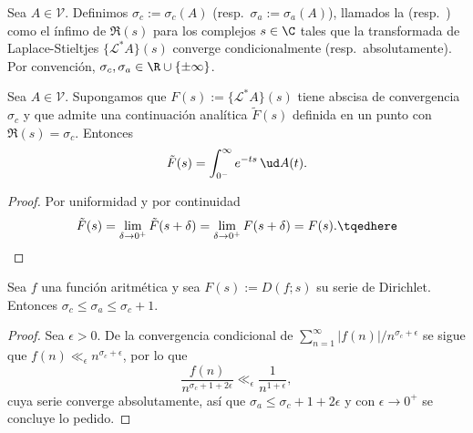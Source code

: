 \documentclass[teoria-numeros.tex]{subfiles}
\begin{document}
\begin{mydef}
	Sea $A \in \mathcal{V}$.
	Definimos $\sigma_c := \sigma_c(A)$ (resp.\ $\sigma_a := \sigma_a(A)$), llamados la 
	(resp.\ ) como el ínfimo de $\Re(s)$ para los complejos $s \in \C$ tales que
	la transformada de Laplace-Stieltjes $\{ \mathcal{L}^*A \}(s)$ converge condicionalmente (resp.\ absolutamente).
	Por convención, $\sigma_c, \sigma_a \in \R \cup \{ \pm\infty \}$.
\end{mydef}

\begin{prop}
	Sea $A \in \mathcal{V}$.
	Supongamos que $F(s) := \{ \mathcal{L}^*A \}(s)$ tiene abscisa de convergencia $\sigma_c$ y que admite una continuación analítica $\tilde F(s)$
	definida en un punto con $\Re(s) = \sigma_c$.
	Entonces
	\[
		\tilde F(s) = \int_{0^-}^{\infty} e^{-ts} \, \ud A(t).
	\]
\end{prop}
\begin{proof}
	Por uniformidad  y por continuidad
	\begin{equation}
		\tilde F(s) = \lim_{\delta\to 0^+} \tilde F(s + \delta) = \lim_{\delta\to 0^+} F(s + \delta) = F(s).
		\tqedhere
	\end{equation}
\end{proof}

\begin{thm}
	Sea $f$ una función aritmética y sea $F(s) := D(f; s)$ su serie de Dirichlet. Entonces $\sigma_c \le \sigma_a \le \sigma_c + 1$.
\end{thm}
\begin{proof}
	Sea $\epsilon > 0$. De la convergencia condicional de $\sum_{n=1}^{\infty} |f(n)|/n^{\sigma_c + \epsilon}$ se sigue que
	$f(n) \ll_\epsilon n^{\sigma_c + \epsilon}$, por lo que
	\[
		\frac{f(n)}{n^{\sigma_c+1+2\epsilon}} \ll_\epsilon \frac{1}{n^{1+\epsilon}},
	\]
	cuya serie converge absolutamente, así que $\sigma_a \le \sigma_c + 1 + 2\epsilon$ y con $\epsilon \to 0^+$ se concluye lo pedido.
\end{proof}
\end{document}
